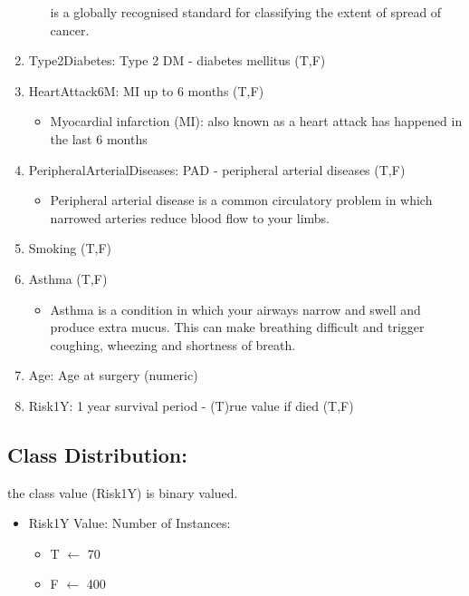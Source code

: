\documentclass[a4paper, 11pt, oneside]{article} %
\begin{document}
\begin{enumerate}
\begin{itemize}
is a globally recognised standard for classifying the extent of spread of cancer.
\end{itemize}
\item Type2Diabetes: Type 2 DM - diabetes mellitus (T,F)
\item HeartAttack6M: MI up to 6 months (T,F)
\begin{itemize}
\item{Myocardial infarction (MI):}
 also known as a heart attack has happened in the last 6 months
\end{itemize}
\item PeripheralArterialDiseases: PAD - peripheral arterial diseases (T,F)
\begin{itemize}
\item {Peripheral arterial disease}
is a common circulatory problem in which narrowed arteries reduce blood flow to your limbs. 
\end{itemize}
\item Smoking (T,F)
\item  Asthma (T,F)
\begin{itemize}
\item {Asthma}
is a condition in which your airways narrow and swell and produce extra mucus. This can make breathing difficult and trigger coughing, wheezing and shortness of breath.
\end{itemize}
\item Age: Age at surgery (numeric)
\item Risk1Y: 1 year survival period - (T)rue value if died (T,F)
\end{enumerate}
\subsection {Class Distribution:}
the class value (Risk1Y) is binary valued.
\begin{itemize}
\item Risk1Y Value: Number of Instances:
\begin{itemize}
\item {T $\leftarrow$ 70}
\item {F $\leftarrow$ 400}
\end{itemize}
\end{itemize}
\newpage
\end{document}
